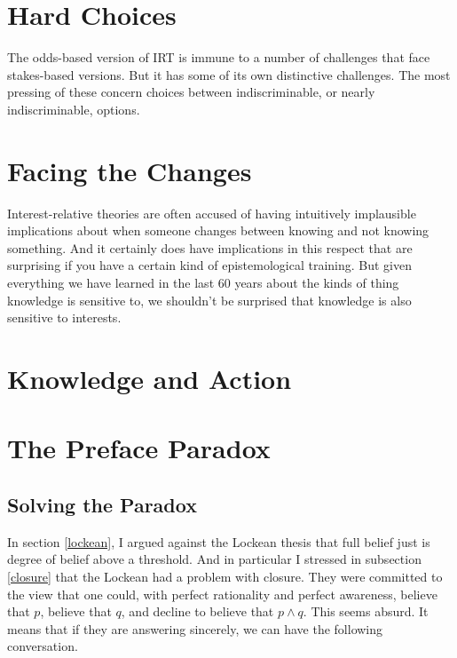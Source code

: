 \documentclass[11pt,]{book}
\begin{document}
\hypertarget{ties}{%
\chapter{Hard Choices}\label{ties}}

The odds-based version of IRT is immune to a number of challenges that face stakes-based versions. But it has some of its own distinctive challenges. The most pressing of these concern choices between indiscriminable, or nearly indiscriminable, options.

\hypertarget{changesobjection}{%
\chapter{Facing the Changes}\label{changesobjection}}

Interest-relative theories are often accused of having intuitively implausible implications about when someone changes between knowing and not knowing something. And it certainly does have implications in this respect that are surprising if you have a certain kind of epistemological training. But given everything we have learned in the last 60 years about the kinds of thing knowledge is sensitive to, we shouldn't be surprised that knowledge is also sensitive to interests.

\hypertarget{kaprinciple}{%
\chapter{Knowledge and Action}\label{kaprinciple}}

\hypertarget{preface}{%
\chapter{The Preface Paradox}\label{preface}}

\hypertarget{solving-the-paradox}{%
\section{Solving the Paradox}\label{solving-the-paradox}}

In section \ref{lockean}, I argued against the Lockean thesis that full belief just is degree of belief above a threshold. And in particular I stressed in subsection \ref{closure} that the Lockean had a problem with closure. They were committed to the view that one could, with perfect rationality and perfect awareness, believe that \(p\), believe that \(q\), and decline to believe that \(p \wedge q\). This seems absurd. It means that if they are answering sincerely, we can have the following conversation.
\end{document}
